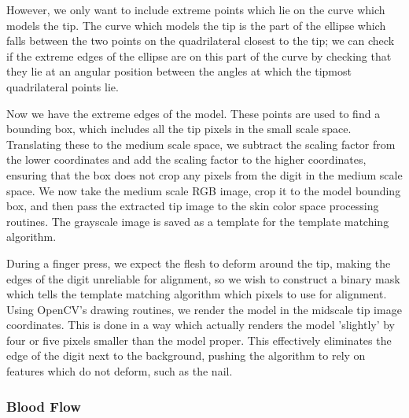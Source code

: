 However, we only want to include extreme points which lie on the curve which models the tip. The curve which models the tip is the part of the ellipse which falls between the two points on the quadrilateral closest to the tip; we can check if the extreme edges of the ellipse are on this part of the curve by checking that they lie at an angular position between the angles at which the tipmost quadrilateral points lie.

Now we have the extreme edges of the model. These points are used to find a bounding box, which includes all the tip pixels in the small scale space. Translating these to the medium scale space, we subtract the scaling factor from the lower coordinates and add the scaling factor to the higher coordinates, ensuring that the box does not crop any pixels from the digit in the medium scale space. We now take the medium scale RGB image, crop it to the model bounding box, and then pass the extracted tip image to the skin color space processing routines. The grayscale image is saved as a template for the template matching algorithm.

During a finger press, we expect the flesh to deform around the tip, making the edges of the digit unreliable for alignment, so we wish to construct a binary mask which tells the template matching algorithm which pixels to use for alignment. Using OpenCV's drawing routines, we render the model in the midscale tip image coordinates. This is done in a way which actually renders the model 'slightly' by four or five pixels smaller than the model proper. This effectively eliminates the edge of the digit next to the background, pushing the algorithm to rely on features which do not deform, such as the nail.

\subsubsection{Blood Flow}\label{sec:BloodFlow}


